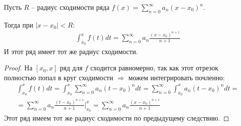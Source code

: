 \begin{theorem}
    Пусть $R$ -- радиус сходимости ряда $f(x) = \sum\limits_{n = 0}^\infty a_n(x - x_0)^n$.
    
    Тогда при $|x - x_0| < R:$
    \begin{gather*}
        \int_{x_0}^x f(t)dt = \sum\limits_{n = 0}^\infty a_n \frac{(x - x_0)^{n+1}}{n+1}
    \end{gather*}
    И этот ряд имеет тот же радиус сходимости.
\end{theorem}
\begin{proof}
    На $[x_0, x]$ ряд для $f$ сходится равномерно, так как этот отрезок полностью попал в круг сходимости $\Rightarrow$ можем интегрировать почленно:
    \begin{gather*}
        \int_{x_0}^x f(t)dt = \int_{x_0}^x \sum_{n=0}^\infty a_n(t - x_0)^n dt = \sum_{n=0}^\infty \int_{x_0}^x a_n(t - x_0)^n dt =  \\
        = \sum_{n = 0}^\infty a_n \frac{(t - x_0)^{n+1}}{n+1}\Big|_{x_0}^x = \sum_{n=0}^\infty a_n \frac{(x - x_0)^{n+1}}{n+1} 
    \end{gather*}
    Этот ряд имеем тот же радиус сходимости по предыдущему следствию.
\end{proof}